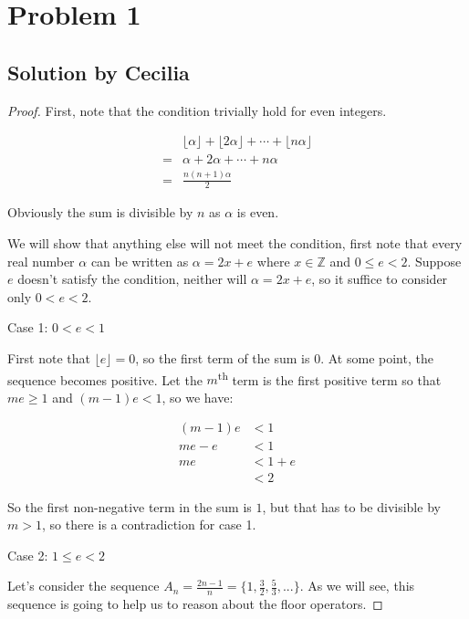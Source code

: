 \section*{Problem 1}

\subsection*{Solution by Cecilia}

\begin{proof}

First, note that the condition trivially hold for even integers.

\begin{align*}
   & \lfloor \alpha \rfloor + \lfloor 2 \alpha \rfloor + \cdots + \lfloor n \alpha \rfloor \\
  =& \alpha + 2\alpha + \cdots + n\alpha                                                   \\
  =& \frac{n(n+1)\alpha}{2}
\end{align*}

Obviously the sum is divisible by $ n $ as $ \alpha $ is even.

We will show that anything else will not meet the condition, first note that every real number $ \alpha $ can be written as $ \alpha = 2x + e $ where $ x \in \mathbb{Z} $ and $ 0 \le e < 2 $. Suppose $ e $ doesn't satisfy the condition, neither will $ \alpha = 2x + e $, so it suffice to consider only $ 0 < e < 2 $.

Case 1: $ 0 < e < 1 $

First note that $ \lfloor e \rfloor = 0 $, so the first term of the sum is $ 0 $. At some point, the sequence becomes positive. Let the $ m $\textsuperscript{th} term is the first positive term so that $ me \ge 1 $ and $ (m-1)e < 1 $, so we have:

\begin{align*}
  (m-1)e &< 1     \\
  me - e &< 1     \\
      me &< 1 + e \\
         &< 2
\end{align*}

So the first non-negative term in the sum is $ 1 $, but that has to be divisible by $ m > 1 $, so there is a contradiction for case 1.

Case 2: $ 1 \le e < 2 $

Let's consider the sequence $ A_n = \frac{2n - 1}{n} = \{1, \frac{3}{2}, \frac{5}{3}, ...\} $. As we will see, this sequence is going to help us to reason about the floor operators.


\end{proof}

